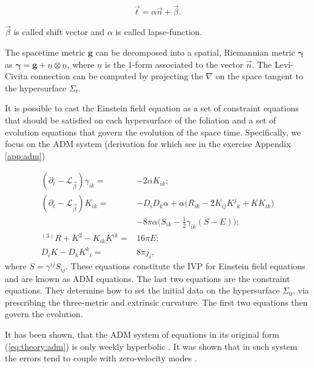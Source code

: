 \documentclass[11pt,a4paper,headinclude=true,DIV=14,BCOR=8mm,chapterprefix,listof=totoc,twoside,openright,abstracton]{scrbook}
\begin{document}
\begin{equation*}
    \vec{t} = \alpha\vec{n}+\vec{\beta}.
\end{equation*}

$\vec{\beta}$ is called shift vector and $\alpha$ is called lapse-function.

The spacetime metric $\boldsymbol{g}$ can be decomposed into a spatial, Riemannian metric $\boldsymbol{\gamma}$  as $\boldsymbol{\gamma} = \boldsymbol{g} + \underline{n} \otimes \underline{n} $, where $\underline{n}$ is the $1$-form associated to the vector $\vec{n}$. 
The Levi-Civita connection can be computed by projecting the $\nabla$ on the space tangent to the hypersurface $\Sigma_t$.


It is possible to cast the Einstein field equation as a set of constraint equations that should be satisfied on each hypersurface of the foliation and a set of evolution equations that govern the evolution of the space time.
Specifically, we focus on the ADM system (derivation for which see in the exercise Appendix \ref{app:adm})

\begin{align}
(\partial_t - \mathcal{L}_{\vec{\beta}})\gamma_{ik} =& -2\alpha K_{ik}; \\
(\partial_t - \mathcal{L}_{\vec{\beta}})K_{ik} =& -D_{i}D_{k}\alpha + \alpha\big(R_{ik} - 2K_{ij}{K^j}_k+KK_{ik}\big) \\
& - 8\pi\alpha\big(S_{ik} - \frac{1}{2}\gamma_{ik}(S-E)\big); \\
{^{(3)}R} + K^2 - K_{ik}K^{ik} =& 16\pi E; \\
D_{i}K-D_{k}{K^k}_i =& 8\pi j_i,
\label{eq:theory:adm}
\end{align}
where $S = \gamma^{ij}S_{ij}$.
These equations constitute the IVP for Einstein field equations and are known as ADM equations. The last two equations are the constraint equations. They determine how to set the initial data on the hypersurface $\Sigma_0$, via prescribing the three-metric and extrinsic curvature. The first two equations then govern the evolution.


It has been shown, that the ADM system of equations in its original form (\ref{eq:theory:adm}) is only weekly hyperbolic \cite{Baumgarte:2002jm}. It was shown that in such system the errors tend to couple with zero-velocity modes \cite{Alcubierre:1999rt}.  
\end{document}

